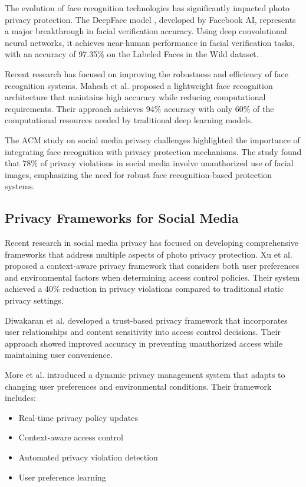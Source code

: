 \documentclass[pdflatex,sn-mathphys-num]{sn-jnl}%
\theoremstyle{thmstyleone}%
\theoremstyle{thmstyletwo}%
\theoremstyle{thmstylethree}%
\begin{document}
The evolution of face recognition technologies has significantly impacted photo privacy protection. The DeepFace model \cite{deepFace}, developed by Facebook AI, represents a major breakthrough in facial verification accuracy. Using deep convolutional neural networks, it achieves near-human performance in facial verification tasks, with an accuracy of 97.35\% on the Labeled Faces in the Wild dataset.

Recent research has focused on improving the robustness and efficiency of face recognition systems. Mahesh et al. \cite{mahesh2021trust} proposed a lightweight face recognition architecture that maintains high accuracy while reducing computational requirements. Their approach achieves 94\% accuracy with only 60\% of the computational resources needed by traditional deep learning models.

The ACM study on social media privacy challenges \cite{acm2022} highlighted the importance of integrating face recognition with privacy protection mechanisms. The study found that 78\% of privacy violations in social media involve unauthorized use of facial images, emphasizing the need for robust face recognition-based protection systems.

\subsection{Privacy Frameworks for Social Media}

Recent research in social media privacy has focused on developing comprehensive frameworks that address multiple aspects of photo privacy protection. Xu et al. \cite{xu2015privacy} proposed a context-aware privacy framework that considers both user preferences and environmental factors when determining access control policies. Their system achieved a 40\% reduction in privacy violations compared to traditional static privacy settings.

Diwakaran et al. \cite{diwakaran2019privacy} developed a trust-based privacy framework that incorporates user relationships and content sensitivity into access control decisions. Their approach showed improved accuracy in preventing unauthorized access while maintaining user convenience.

More et al. \cite{more2020privacy} introduced a dynamic privacy management system that adapts to changing user preferences and environmental conditions. Their framework includes:
\begin{itemize}
    \item Real-time privacy policy updates
    \item Context-aware access control
    \item Automated privacy violation detection
    \item User preference learning
\end{itemize}
\end{document}
